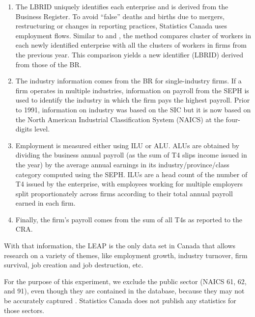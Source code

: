 \begin{enumerate}

\item The LBRID uniquely identifies each enterprise and is derived from the Business Register. To avoid ``false'' deaths and births due to mergers, restructuring or changes in reporting practices, Statistics Canada uses employment flows. Similar to \citet{BenedettoEtAl2007} and \citet{RePEc:iab:iabfme:201006_en}, the method  compares cluster of workers in each newly identified enterprise with all the clusters of workers in firms from the previous year. This comparison yields a new identifier (LBRID) derived from those of the \ac{BR}.

\item The industry information comes from the \ac{BR} for single-industry firms. If a firm operates in multiple industries, information on payroll from the \ac{SEPH} is used to identify the industry in which the firm pays the highest payroll. Prior to 1991, information on industry was based on the SIC but it is now based on the  North American Industrial Classification System (NAICS) at the four-digits level. 

\item Employment is measured either using \ac{ILU} or \ac{ALU}. \acp{ALU} are obtained by dividing the business annual payroll (as the sum of T4 slips income issued in the year) by the average annual earnings in its industry/province/class category computed using the \ac{SEPH}. \acp{ILU} are a head count of the number of T4 issued by the enterprise, with employees working for multiple employers split proportionately across firms according to their total annual payroll earned in each firm. 

\item Finally, the firm's payroll comes from the sum of all T4s as reported to the CRA.

\end{enumerate}
With that information, the \ac{LEAP} is the only data set in Canada  that allows research on a variety of themes, like employment growth, industry turnover, firm survival, job creation and job destruction, etc. 

For the purpose of this experiment,  we exclude the public sector (NAICS 61, 62, and 91), even though they are contained in the database, because they may not be accurately captured \citep{StatisticsCanada2019}. Statistics Canada does not publish any statistics for those sectors.